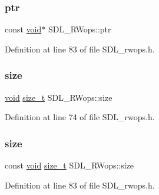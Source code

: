 \subsubsection{\texorpdfstring{ptr}{ptr}\hspace{0.1cm}{\footnotesize\ttfamily [2/2]}}
{\footnotesize\ttfamily const \mbox{\hyperlink{_s_d_l__opengles2__gl2ext_8h_ae5d8fa23ad07c48bb609509eae494c95}{void}}$\ast$ S\+D\+L\+\_\+\+R\+Wops\+::ptr}



Definition at line 83 of file S\+D\+L\+\_\+rwops.\+h.

\mbox{\label{struct_s_d_l___r_wops_ab078bcf43a916d469ff550c60ab4b3f2}} 
\subsubsection{\texorpdfstring{size}{size}\hspace{0.1cm}{\footnotesize\ttfamily [1/2]}}
{\footnotesize\ttfamily \mbox{\hyperlink{_s_d_l__opengles2__gl2ext_8h_ae5d8fa23ad07c48bb609509eae494c95}{void}} \mbox{\hyperlink{struct_s_d_l___r_wops_acd9a3c6e840d285c1e30cadaf99097b2}{size\+\_\+t}} S\+D\+L\+\_\+\+R\+Wops\+::size}



Definition at line 74 of file S\+D\+L\+\_\+rwops.\+h.

\mbox{\label{struct_s_d_l___r_wops_a74d37eb068407bd5cdbdb845e4c4663a}} 
\subsubsection{\texorpdfstring{size}{size}\hspace{0.1cm}{\footnotesize\ttfamily [2/2]}}
{\footnotesize\ttfamily const \mbox{\hyperlink{_s_d_l__opengles2__gl2ext_8h_ae5d8fa23ad07c48bb609509eae494c95}{void}} \mbox{\hyperlink{struct_s_d_l___r_wops_acd9a3c6e840d285c1e30cadaf99097b2}{size\+\_\+t}} S\+D\+L\+\_\+\+R\+Wops\+::size}



Definition at line 83 of file S\+D\+L\+\_\+rwops.\+h.

\mbox{\label{struct_s_d_l___r_wops_a4108a41afa8b62e75b0f160de4b56103}} 
